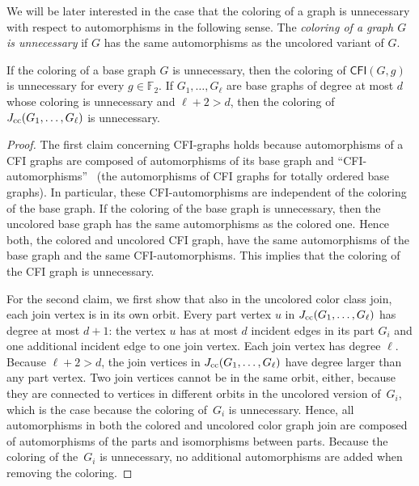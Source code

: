 \documentclass[]{lmcs}
\newcommand{\FF}{\mathbb{F}}
\newcommand{\defining}[1]{\emph{#1}}
\newcommand{\vertA}{u}
\newcommand{\CFIsym}{\mathsf{CFI}}
\newcommand{\CFI}[1]{\CFIsym(#1)}
\begin{document}
We will be later interested in the case that the coloring of a graph is unnecessary with respect to automorphisms in the following sense.
The \defining{coloring of a graph $G$ is unnecessary}
if $G$ has the same automorphisms as the uncolored variant of $G$.
\begin{lem}
	\label{lem:unnecessary-colorings}
	If the coloring of a base graph $G$ is unnecessary,
	then the coloring of $\CFI{G,g}$ is unnecessary for every $g \in \FF_2$.
	If $G_1,\dots, G_\ell$ are base graphs of degree at most $d$ 
	whose coloring is unnecessary and $\ell+2 > d$,
	then the coloring of $J_{\text{cc}}(G_1,\dots, G_\ell)$ is unnecessary.
\end{lem}
\begin{proof}
	The first claim concerning CFI-graphs holds because automorphisms of a CFI
	graphs are composed of automorphisms of its base graph and ``CFI-automorphisms''~\cite{Pago23} (the automorphisms of CFI graphs for totally ordered base graphs). In particular, these CFI-automorphisms are independent of the coloring of the base graph.
	If the coloring of the base graph is unnecessary,
	then the uncolored base graph has the same automorphisms as the colored one.
	Hence both, the colored and uncolored CFI graph,
	have the same automorphisms of the base graph and the same CFI-automorphisms.
	This implies that the coloring of the CFI graph is unnecessary.
	
	For the second claim, we first show that also in the uncolored color class join, each join vertex is in its own orbit.
	Every part vertex $\vertA$ in $J_{\text{cc}}(G_1,\dots, G_\ell)$ has degree at most $d+1$: the vertex $\vertA$ has at most $d$ incident edges in its part $G_i$ and one additional incident edge to one join vertex.
	Each join vertex has degree $\ell$.
	Because $\ell+2 > d$, the join vertices in $J_{\text{cc}}(G_1,\dots, G_\ell)$ have degree larger than any part vertex.
	Two join vertices cannot be in the same orbit, either, because they are connected to vertices in different orbits in the uncolored version of~$G_i$,
	which is the case because the coloring of~$G_i$ is unnecessary.
	Hence, all automorphisms in both the colored and uncolored color graph join
	are composed of automorphisms of the parts and isomorphisms between parts.
	Because the coloring of the~$G_i$ is unnecessary, no additional automorphisms are added when removing the coloring.
\end{proof}
\end{document}
